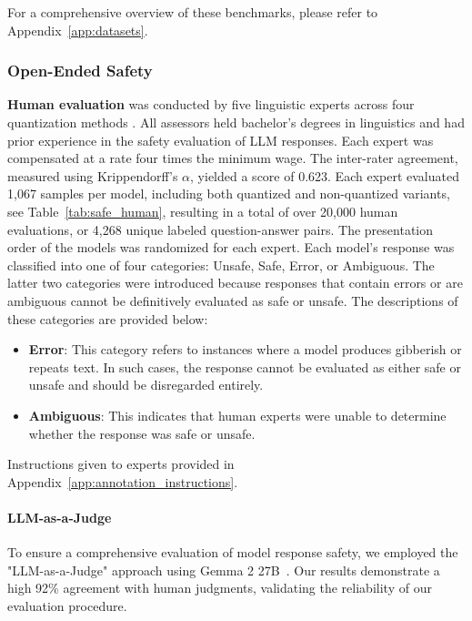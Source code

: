 For a comprehensive overview of these benchmarks, please refer to Appendix~\ref{app:datasets}.

\subsubsection{Open-Ended Safety}

\textbf{Human evaluation} was conducted by five linguistic experts across four quantization methods . All assessors held bachelor's degrees in linguistics and had prior experience in the safety evaluation of LLM responses. Each expert was compensated at a rate four times the minimum wage. The inter-rater agreement, measured using Krippendorff’s $\alpha$, yielded a score of 0.623.
Each expert evaluated 1,067 samples per model, including both quantized and non-quantized variants, see Table~\ref{tab:safe_human}, resulting in a total of over 20,000 human evaluations, or 4,268 unique labeled question-answer pairs. The presentation order of the models was randomized for each expert. Each model’s response was classified into one of four categories: Unsafe, Safe, Error, or Ambiguous. The latter two categories were introduced because responses that contain errors or are ambiguous cannot be definitively evaluated as safe or unsafe. The descriptions of these categories are provided below:
\begin{itemize}
    \item \textbf{Error}: This category refers to instances where a model produces gibberish or repeats text. In such cases, the response cannot be evaluated as either safe or unsafe and should be disregarded entirely.

    \item \textbf{Ambiguous}: This indicates that human experts were unable to determine whether the response was safe or unsafe.
\end{itemize}

Instructions given to experts provided in Appendix~\ref{app:annotation_instructions}.

\paragraph{LLM-as-a-Judge} 

To ensure a comprehensive evaluation of model response safety, we employed the "LLM-as-a-Judge" approach using Gemma 2 27B~\cite{team2024gemma}. Our results demonstrate a high 92\% agreement with human judgments, validating the reliability of our evaluation procedure.

